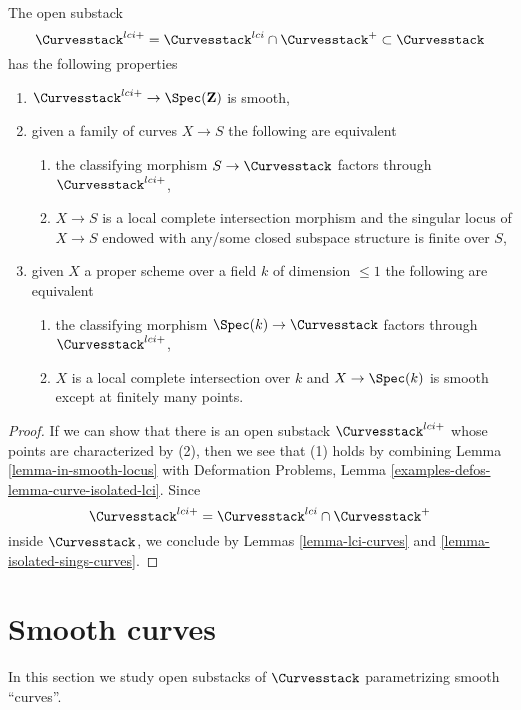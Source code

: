 \begin{lemma}
\label{lemma-big-smooth-part-curves}
The open substack
$$
\Curvesstack^{lci+} =
\Curvesstack^{lci} \cap \Curvesstack^{+}
\subset \Curvesstack
$$
has the following properties
\begin{enumerate}
\item $\Curvesstack^{lci+} \to \Spec(\mathbf{Z})$ is smooth,
\item given a family of curves $X \to S$ the following are equivalent
\begin{enumerate}
\item the classifying morphism $S \to \Curvesstack$ factors through
$\Curvesstack^{lci+}$,
\item $X \to S$ is a local complete intersection morphism and
the singular locus of $X \to S$ endowed with any/some closed subspace
structure is finite over $S$,
\end{enumerate}
\item given $X$ a proper scheme over a field $k$ of dimension $\leq 1$
the following are equivalent
\begin{enumerate}
\item the classifying morphism $\Spec(k) \to \Curvesstack$ factors
through $\Curvesstack^{lci+}$,
\item $X$ is a local complete intersection over $k$ and
$X \to \Spec(k)$ is smooth except at finitely many points.
\end{enumerate}
\end{enumerate}
\end{lemma}

\begin{proof}
If we can show that there is an open substack $\Curvesstack^{lci+}$
whose points are characterized by (2), then we see that
(1) holds by combining Lemma \ref{lemma-in-smooth-locus} with
Deformation Problems, Lemma \ref{examples-defos-lemma-curve-isolated-lci}.
Since
$$
\Curvesstack^{lci+} = \Curvesstack^{lci} \cap \Curvesstack^{+}
$$
inside $\Curvesstack$, we conclude by
Lemmas \ref{lemma-lci-curves} and \ref{lemma-isolated-sings-curves}.
\end{proof}




\section{Smooth curves}
\label{section-smooth-curves}

\noindent
In this section we study open substacks of $\Curvesstack$
parametrizing smooth ``curves''.

